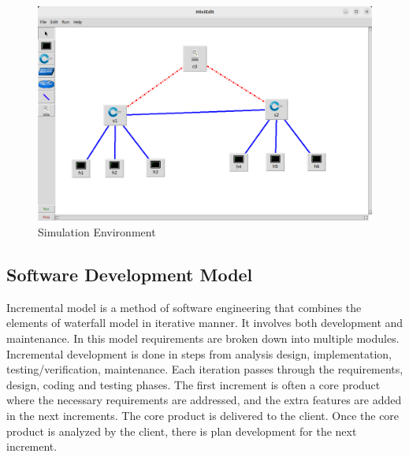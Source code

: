 \begin{figure}[tbh]
	\begin{center}
		\includegraphics[width=5in]{images/simenv.png} 
		\caption{Simulation Environment} %
		\label{Simulation Environment} %
	\end{center}
\end{figure}
\subsection{Software Development Model}
\vspace{-18pt}
Incremental model is a method of software engineering that combines the elements of waterfall model in iterative manner. It involves both development and maintenance. In this model requirements are broken down into multiple modules. Incremental development is done in steps from analysis design, implementation, testing/verification, maintenance. Each iteration passes through the requirements, design, coding and testing phases. The first increment is often a core product where the necessary requirements are addressed, and the extra features are added in the next increments. The core product is delivered to the client. Once the core product is analyzed by the client, there is plan development for the next increment.

